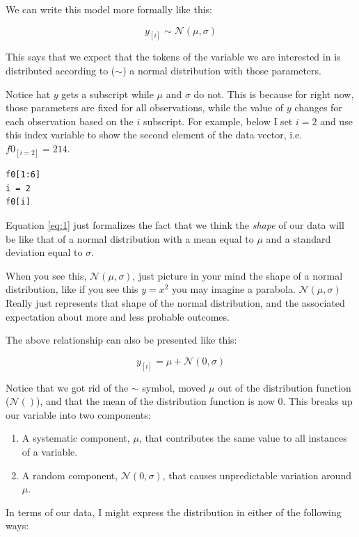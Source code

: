\documentclass[
]{book}
\begin{document}
We can write this model more formally like this:

\[
y_{[i]} \sim \mathcal{N}(\mu,\sigma)
\label{eq:1}
\]

This says that we expect that the tokens of the variable we are interested in is distributed according to (\(\sim\)) a normal distribution with those parameters.

Notice hat \(y\) gets a subscript while \(\mu\) and \(\sigma\) do not. This is because for right now, those parameters are fixed for all observations, while the value of \(y\) changes for each observation based on the \(i\) subscript. For example, below I set \(i=2\) and use this index variable to show the second element of the data vector, i.e.~\(f0_{[i=2]}=214\).

\begin{verbatim}
f0[1:6]
i = 2
f0[i]
\end{verbatim}

Equation \eqref{eq:1} just formalizes the fact that we think the \emph{shape} of our data will be like that of a normal distribution with a mean equal to \(\mu\) and a standard deviation equal to \(\sigma\).

When you see this, \(\mathcal{N}(\mu,\sigma)\), just picture in your mind the shape of a normal distribution, like if you see this \(y=x^2\) you may imagine a parabola. \(\mathcal{N}(\mu,\sigma)\) Really just represents that shape of the normal distribution, and the associated expectation about more and less probable outcomes.

The above relationship can also be presented like this:

\[
y_{[i]} = \mu + \mathcal{N}(0,\sigma)
\label{eq:2}
\]

Notice that we got rid of the \(\sim\) symbol, moved \(\mu\) out of the distribution function (\(\mathcal{N}()\)), and that the mean of the distribution function is now 0. This breaks up our variable into two components:

\begin{enumerate}
\def\labelenumi{\arabic{enumi})}
\item
  A systematic component, \(\mu\), that contributes the same value to all instances of a variable.
\item
  A random component, \(\mathcal{N}(0,\sigma)\), that causes unpredictable variation around \(\mu\).
\end{enumerate}

In terms of our data, I might express the distribution in either of the following ways:
\end{document}
